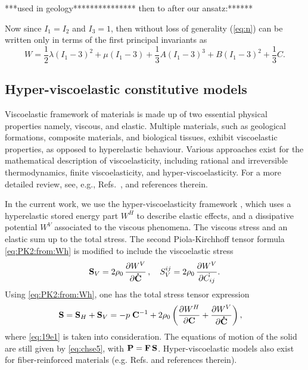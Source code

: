 \documentclass[11pt,letter,subeqn,fleqn]{article}
\numberwithin{equation}{section}
\numberwithin{table}{section}
\numberwithin{figure}{section}
\def\beq{\begin{equation}}
\def\eeq{\end{equation}}
\def\vec#1{{\boldsymbol{\rm #1}}} %
\def\tens#1{{\boldsymbol{\rm #1}}} %
\def\vec#1{{\boldsymbol{\rm #1}}} %
\def\tens#1{{\boldsymbol{\rm #1}}} %
\begin{document}
***used in geology*************** then to after our ansatz:******

Now since $I_{1}=I_{2}$ and $I_{3}=1$, then without loss of generality (\ref{eq:n}) can be written only in terms of the first principal invariants as
\begin{equation}\label{eq:n1}
W=\frac{1}{2}\lambda (I_{1}-3)^{2}+\mu (I_{1}-3)+\frac{1}{3} A (I_{1}-3)^{3}+B (I_{1}-3)^{2}+\frac{1}{3}C.
\end{equation}


\subsection{Hyper-viscoelastic constitutive models}\label{sec:visco:framew}

Viscoelastic framework of materials is made up of two essential physical properties namely, viscous, and elastic. Multiple materials, such as geological formations, composite materials, and biological tissues, exhibit viscoelastic properties, as opposed to hyperelastic behaviour. Various approaches exist for the mathematical description of viscoelasticity, including rational and irreversible thermodynamics, finite viscoelasticity, and hyper-viscoelasticity. For a more detailed review, see, e.g., Refs.~\cite{thesisBader, cheviakov2016one}, and references therein.

In the current work, we use the hyper-viscoelasticity framework \cite{holzapfel2000nonlinear}, which uses a hyperelastic stored energy part $W^H$ to describe elastic effects, and a dissipative potential $W^V$ associated to the viscous phenomena. The viscous stress and an elastic sum up to the total stress. The second Piola-Kirchhoff tensor formula \eqref{eq:PK2:from:Wh} is modified to include the viscoelastic stress
\beq\label{eq:PK2:viscoel}
\tens{S}_V = 2 \rho_0 \,\dfrac{\partial W^V}{\partial\tens{\dot{C}}}\,, \quad S^{ij}_{V}=2 \rho_0 \,\dfrac{\partial W^V}{\partial{\dot{C_{ij}}}}.
\eeq
Using \eqref{eq:PK2:from:Wh}, one has the total stress tensor expression
\beq\label{eq:PK2:viscoel:tot}
\tens{S} = \tens{S}_H + \tens{S}_V = -p\;\tens{C}^{-1} + 2 \rho_0 \left(\dfrac{\partial W^H}{\partial\tens{C}} + \dfrac{\partial W^V}{\partial\tens{\dot{C}}}\right), \quad
\eeq
where \eqref{eq:19e1} is taken into consideration. The equations of motion of the solid are still given by \eqref{eq:chse5}, with $\tens{P} = \tens{F}\,\tens{S}$. Hyper-viscoelastic models also exist for fiber-reinforced materials (e.g. Refs. \cite{cheviakov2016one,pioletti2000non} and references therein).
\end{document}
